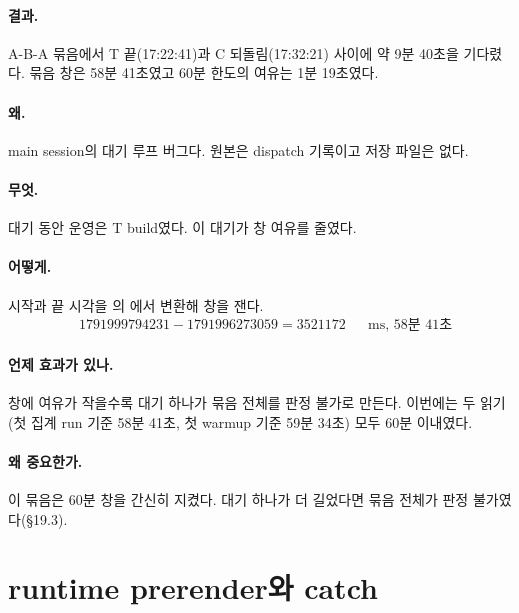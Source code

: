 \paragraph{결과.}
A-B-A 묶음에서 T 끝(17:22:41)과 C 되돌림(17:32:21) 사이에 약 9분 40초을 기다렸다.
묶음 창은 58분 41초였고 60분 한도의 여유는 1분 19초였다.

\paragraph{왜.}
main session의 대기 루프 버그다. 원본은 dispatch 기록이고 저장 파일은 없다.

\paragraph{무엇.}
대기 동안 운영은 T build였다. 이 대기가 창 여유를 줄였다.

\paragraph{어떻게.}
시작과 끝 시각을 의 에서 변환해 창을 잰다.
\begin{align*}
  &1791999794231-1791996273059 = 3521172 && \text{ms, 58분 41초}
\end{align*}

\paragraph{언제 효과가 있나.}
창에 여유가 작을수록 대기 하나가 묶음 전체를 판정 불가로 만든다.
이번에는 두 읽기(첫 집계 run 기준 58분 41초, 첫 warmup 기준 59분 34초) 모두 60분 이내였다.

\paragraph{왜 중요한가.}
이 묶음은 60분 창을 간신히 지켰다. 대기 하나가 더 길었다면 묶음 전체가 판정 불가였다(\S19.3).

\section{runtime prerender와 catch}\label{sec:le-prerender}

